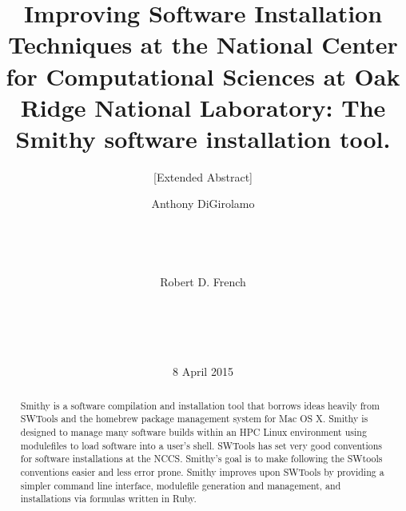 \documentclass{acm_proc_article-sp}
\begin{document}
\title{Improving Software Installation Techniques at the National Center for Computational Sciences at Oak Ridge National Laboratory: The Smithy software installation tool.}

\subtitle{[Extended Abstract]}

%
\author{
\alignauthor
Anthony DiGirolamo\\ %
       \\
       \\
       \\
       \\
\alignauthor
Robert D. French\\ %
       \\
       \\
       \\
       \\
}

\date{8 April 2015}

\maketitle

\begin{abstract}
Smithy is a software compilation and installation tool that borrows ideas
heavily from SWTools\cite{swtools} and the homebrew\cite{homebrew} package
management system for Mac OS X.  Smithy is designed to manage many software
builds within an HPC Linux environment using modulefiles to load software into a
user's shell.  SWTools has set very good conventions for software installations
at the NCCS.  Smithy's goal is to make following the SWtools conventions easier
and less error prone.  Smithy improves upon SWTools by providing a simpler
command line interface, modulefile generation and management, and installations
via formulas written in Ruby.
\end{abstract}
\end{document}

